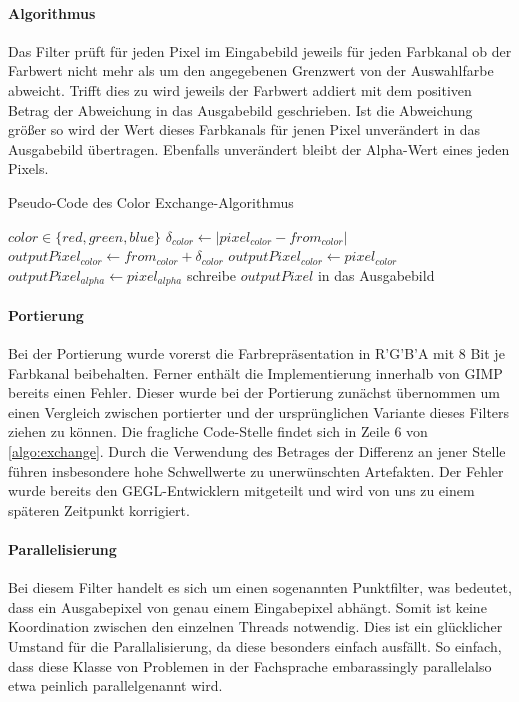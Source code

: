 \documentclass[10pt,a4paper]{article}
\providecommand{\abs}[1]{\lvert#1\rvert}
\begin{document}
\paragraph{Algorithmus} 

Das Filter prüft für jeden Pixel im Eingabebild jeweils für jeden Farbkanal ob der Farbwert nicht mehr als um den angegebenen Grenzwert von der Auswahlfarbe abweicht. Trifft dies zu wird jeweils der Farbwert addiert mit dem positiven Betrag der Abweichung in das Ausgabebild geschrieben. Ist die Abweichung größer so wird der Wert dieses Farbkanals für jenen Pixel unverändert in das Ausgabebild übertragen. Ebenfalls unverändert bleibt der Alpha-Wert eines jeden Pixels.

\begin{algorithm}[H]
\caption{Pseudo-Code des \glqq Color Exchange\grqq-Algorithmus}
\label{algo:exchange}
\begin{algorithmic}[1]
\State $color \in \{red, green, blue\}$
  \State $\delta_{color} \gets \abs{ pixel_{color} - from_{color}}$    
      \State $outputPixel_{color} \gets from_{color} + \delta_{color}$
    \EndFor
  \Else
      \State $outputPixel_{color} \gets pixel_{color}$
    \EndFor
  \EndIf
  \State $outputPixel_{alpha} \gets pixel_{alpha}$
  \State schreibe $outputPixel$ in das Ausgabebild
\EndFor
\end{algorithmic}
\end{algorithm}

\paragraph{Portierung}
Bei der Portierung wurde vorerst die Farbrepräsentation in R'G'B'A mit 8 Bit je Farbkanal beibehalten. Ferner enthält die Implementierung innerhalb von GIMP bereits einen Fehler. Dieser wurde bei der Portierung zunächst übernommen um einen Vergleich zwischen portierter und der ursprünglichen Variante dieses Filters ziehen zu können. Die fragliche Code-Stelle findet sich in Zeile 6 von \autoref{algo:exchange}. Durch die Verwendung des Betrages der Differenz an jener Stelle führen insbesondere hohe Schwellwerte zu unerwünschten Artefakten. Der Fehler wurde bereits den GEGL-Entwicklern mitgeteilt und wird von uns zu einem späteren Zeitpunkt korrigiert.

\paragraph{Parallelisierung}
Bei diesem Filter handelt es sich um einen sogenannten Punktfilter, was bedeutet, dass ein Ausgabepixel von genau einem Eingabepixel abhängt. Somit ist keine Koordination zwischen den einzelnen Threads notwendig. Dies ist ein glücklicher Umstand für die Parallalisierung, da diese besonders einfach ausfällt. So einfach, dass diese Klasse von Problemen in der Fachsprache \glqq embarassingly parallel\grqq also etwa \glqq peinlich parallel\grqq genannt wird.
\end{document}
